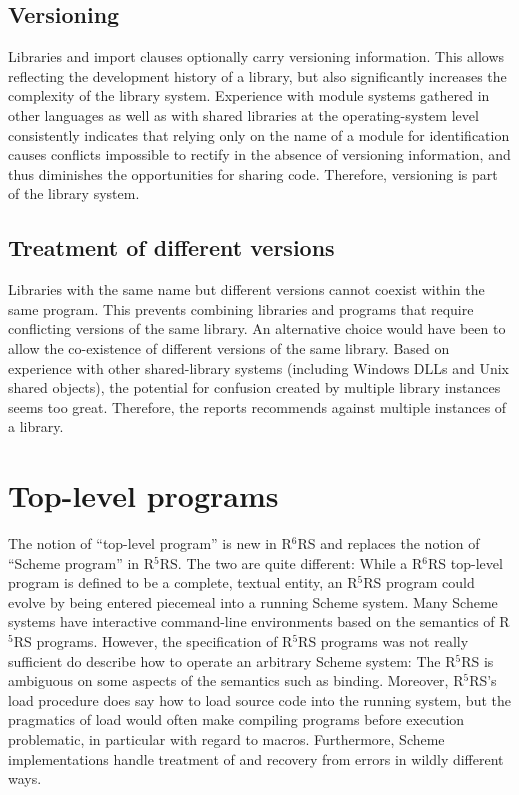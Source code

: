 \documentclass[twoside,twocolumn]{algol60}
\newcommand{\rn}[1]{R$^{#1}$RS}
\begin{document}
\section{Versioning}

Libraries and {\cf import} clauses optionally carry versioning
information.  This allows reflecting the development history of a
library, but also significantly increases the complexity of the
library system.  Experience with module systems gathered in other
languages as well as with shared libraries at the operating-system
level consistently indicates that relying only on the name of a module
for identification causes conflicts impossible to rectify in the
absence of versioning information, and thus diminishes the
opportunities for sharing code.  Therefore, versioning is part of the
library system.

\section{Treatment of different versions}

Libraries with the same name but different versions cannot coexist
within the same program.  This prevents combining libraries and
programs that require conflicting versions of the same library.  An
alternative choice would have been to allow the co-existence of
different versions of the same library.  Based on experience with
other shared-library systems (including Windows DLLs and Unix shared
objects), the potential for confusion created by multiple library
instances seems too great.  Therefore, the reports recommends against
multiple instances of a library.

\chapter{Top-level programs}

The notion of ``top-level program'' is new in \rn{6} and replaces the
notion of ``Scheme program'' in \rn{5}.  The two are quite different:
While a \rn{6} top-level program is defined to be a complete, textual
entity, an \rn{5} program could evolve by being entered piecemeal into
a running Scheme system.  Many Scheme systems have interactive
command-line environments based on the semantics of \rn{5} programs.
However, the specification of \rn{5} programs was not really
sufficient do describe how to operate an arbitrary Scheme system: The
\rn{5} is ambiguous on some aspects of the semantics such as binding.
Moreover, \rn{5}'s {\cf load} procedure does say how to load source
code into the running system, but the pragmatics of {\cf load} would
often make compiling programs before execution problematic, in
particular with regard to macros.  Furthermore, Scheme implementations
handle treatment of and recovery from errors in wildly different ways.
\end{document}
